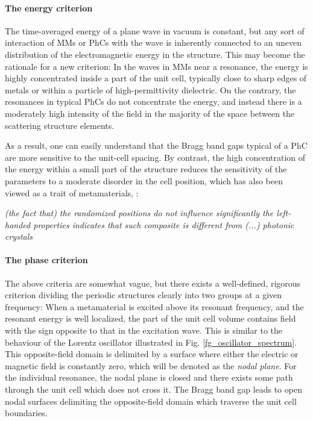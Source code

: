 \paragraph{The energy criterion} %
The time-averaged energy of a plane wave in vacuum is constant, but any sort of interaction of MMs or PhCs with the wave is inherently connected to an uneven distribution of the electromagnetic energy in the structure. This may become the rationale for a new criterion: In the waves in MMs near a resonance, the energy is highly concentrated inside a part of the unit cell, typically close to sharp edges of metals or within a particle of high-permittivity dielectric. On the contrary, the resonances in typical PhCs do not concentrate the energy, and instead there is a moderately high intensity of the field in the majority of the space between the scattering structure elements.

As a result, one can easily understand that the Bragg band gaps typical of a PhC are more sensitive to the unit-cell spacing. 
By contrast, the high concentration of the energy within a small part of the structure reduces the sensitivity of the parameters to a moderate disorder in the cell position, which has also been viewed as a trait of metamaterials, \cite{peng2007}: 
\begin{displayquote}
	\textit{(the fact that) the randomized positions do not influence significantly the left-handed properties indicates that such composite is different from (...) photonic crystals}
\end{displayquote}

\paragraph{The phase criterion} %
\label{phasecriterion}
The above criteria are somewhat vague, but there exists a well-defined, rigorous criterion dividing the periodic structures clearly into two groups at a given frequency: When a metamaterial is excited above its resonant frequency, and the resonant energy is well localized, the part of the unit cell volume contains field with the sign opposite to that in the excitation wave. This is similar to the behaviour of the Lorentz oscillator illustrated in Fig. \ref{fg_oscillator_spectrum}. %
This opposite-field domain is delimited by a surface where either the electric or magnetic field is constantly zero, which will be denoted as the \textit{nodal plane}. For the individual resonance, the nodal plane is closed and there exists some path through the unit cell which does not cross it. The Bragg band gap leads to open nodal surfaces delimiting the opposite-field domain which traverse the unit cell boundaries. %

